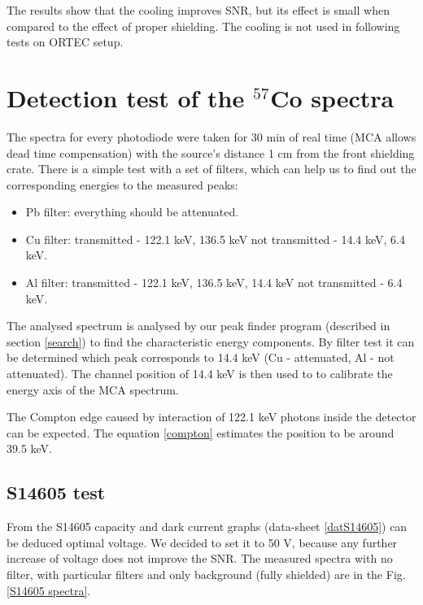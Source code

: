 \par
The results show that the cooling improves SNR, but its effect is small when compared to the effect of proper shielding. The cooling is not used in following tests on ORTEC setup.

\section{Detection test of the $^{57}$Co spectra}
The spectra for every photodiode were taken for 30 min of real time (MCA allows dead time compensation) with the source's distance 1 cm from the front shielding crate. There is a simple test with a set of filters, which can help us to find out the corresponding energies to the measured peaks:

\begin{itemize}
\item Pb filter: everything should be attenuated.
\item Cu filter: transmitted - 122.1 keV, 136.5 keV not transmitted - 14.4 keV, 6.4 keV.
\item Al filter: transmitted - 122.1 keV, 136.5 keV, 14.4 keV not transmitted - 6.4 keV.
\end{itemize}

The analysed spectrum is analysed by our peak finder program (described in section \ref{search}) to find the characteristic energy components. By filter test it can be determined which peak corresponds to 14.4 keV (Cu - attenuated, Al - not attenuated). The channel position of 14.4 keV is then used to to calibrate the energy axis of the MCA spectrum.
\par
The Compton edge caused by interaction of 122.1 keV photons inside the detector can be expected. The equation \ref{compton} estimates the position to be around 39.5 keV. 

\subsection{S14605 test}
From the S14605 capacity and dark current graphs (data-sheet \ref{datS14605}) can be deduced optimal voltage. We decided to set it to 50 V, because any further increase of voltage does not improve the SNR. The measured spectra with no filter, with particular filters and only background (fully shielded) are in the Fig. \ref{S14605 spectra}.


